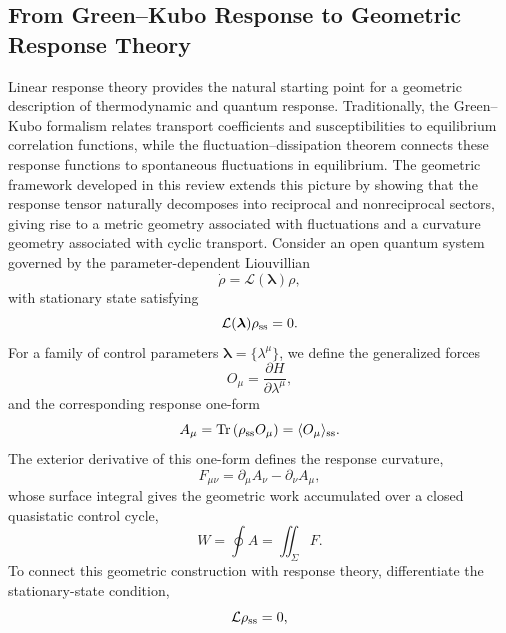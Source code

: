 \subsection{From Green--Kubo Response to Geometric Response Theory}
\label{sec:GreenKuboGeometry}
Linear response theory provides the natural starting point for a
geometric description of thermodynamic and quantum response.
Traditionally, the Green--Kubo formalism relates transport
coefficients and susceptibilities to equilibrium correlation
functions, while the fluctuation--dissipation theorem connects
these response functions to spontaneous fluctuations in
equilibrium. The geometric framework developed in this review
extends this picture by showing that the response tensor naturally
decomposes into reciprocal and nonreciprocal sectors, giving rise
to a metric geometry associated with fluctuations and a curvature
geometry associated with cyclic transport.
Consider an open quantum system governed by the parameter-dependent
Liouvillian
%
\begin{equation}
\dot{\rho}
=
\mathcal L(\bm{\lambda})\rho,
\end{equation}
%
with stationary state satisfying
%
\begin{equation}
\mathcal L(\bm{\lambda})
\rho_{\rm ss}
=
0.
\end{equation}
%
For a family of control parameters
$\bm{\lambda}=\{\lambda^\mu\}$,
we define the generalized forces
%
\begin{equation}
O_\mu
=
\frac{\partial H}
{\partial\lambda^\mu},
\end{equation}
%
and the corresponding response one-form
%
\begin{equation}
A_\mu
=
\mathrm{Tr}
\left(
\rho_{\rm ss}
O_\mu
\right)
=
\langle O_\mu\rangle_{\rm ss}.
\end{equation}
%
The exterior derivative of this one-form defines the response
curvature,
%
\begin{equation}
F_{\mu\nu}
=
\partial_\mu A_\nu
-
\partial_\nu A_\mu,
\end{equation}
%
whose surface integral gives the geometric work accumulated over a
closed quasistatic control cycle,
%
\begin{equation}
W
=
\oint A
=
\iint_\Sigma
F.
\end{equation}
To connect this geometric construction with response theory,
differentiate the stationary-state condition,
%
\begin{equation}
\mathcal L
\rho_{\rm ss}
=
0,
\end{equation}
